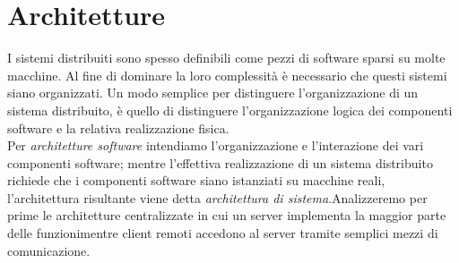\section{Architetture}\label{capitolo2}
I sistemi distribuiti sono spesso definibili come pezzi di software sparsi su molte macchine. Al fine di dominare la loro complessità è necessario che questi sistemi siano organizzati. Un modo semplice per distinguere l'organizzazione di un sistema distribuito, è quello di distinguere l'organizzazione logica dei componenti software e la relativa realizzazione fisica.\\
Per \emph{architetture software} intendiamo l'organizzazione e l'interazione dei vari componenti software; mentre l'effettiva realizzazione di un sistema distribuito richiede che i componenti software siano istanziati su macchine reali, l'architettura risultante viene detta \emph{architettura di sistema}.Analizzeremo per prime le architetture centralizzate in cui un server implementa la maggior parte delle funzionimentre client remoti accedono al server tramite semplici mezzi di comunicazione.\\

